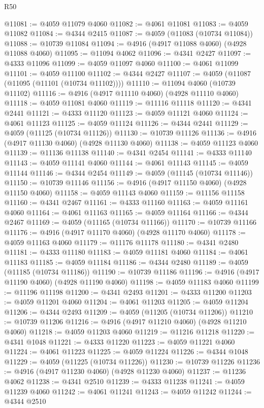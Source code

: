 \begin{lexlean}{R50}
\begin{coremodule}
@11081 := @4059 @11079 @4060
@11082 := @4061 @11081
@11083 := @4059 @11082
@11084 := @4344 @2415
@11087 := @4059 (@11083 (@10734 @11084))
@11088 := @10739 @11084
@11094 := @4916 (@4917 @11088 @4060) (@4928 @11088 @4060)
@11095 := @11094 @4062
@11096 := @4341 @2427
@11097 := @4333 @11096
@11099 := @4059 @11097 @4060
@11100 := @4061 @11099
@11101 := @4059 @11100
@11102 := @4344 @2427
@11107 := @4059 (@11087 (@11095 (@11101 (@10734 @11102))))
@11110 := @11094 @4060 (@10739 @11102)
@11116 := @4916 (@4917 @11110 @4060) (@4928 @11110 @4060)
@11118 := @4059 @11081 @4060
@11119 := @11116 @11118
@11120 := @4341 @2441
@11121 := @4333 @11120
@11123 := @4059 @11121 @4060
@11124 := @4061 @11123
@11125 := @4059 @11124
@11126 := @4344 @2441
@11129 := @4059 (@11125 (@10734 @11126))
@11130 := @10739 @11126
@11136 := @4916 (@4917 @11130 @4060) (@4928 @11130 @4060)
@11138 := @4059 @11123 @4060
@11139 := @11136 @11138
@11140 := @4341 @2454
@11141 := @4333 @11140
@11143 := @4059 @11141 @4060
@11144 := @4061 @11143
@11145 := @4059 @11144
@11146 := @4344 @2454
@11149 := @4059 (@11145 (@10734 @11146))
@11150 := @10739 @11146
@11156 := @4916 (@4917 @11150 @4060) (@4928 @11150 @4060)
@11158 := @4059 @11143 @4060
@11159 := @11156 @11158
@11160 := @4341 @2467
@11161 := @4333 @11160
@11163 := @4059 @11161 @4060
@11164 := @4061 @11163
@11165 := @4059 @11164
@11166 := @4344 @2467
@11169 := @4059 (@11165 (@10734 @11166))
@11170 := @10739 @11166
@11176 := @4916 (@4917 @11170 @4060) (@4928 @11170 @4060)
@11178 := @4059 @11163 @4060
@11179 := @11176 @11178
@11180 := @4341 @2480
@11181 := @4333 @11180
@11183 := @4059 @11181 @4060
@11184 := @4061 @11183
@11185 := @4059 @11184
@11186 := @4344 @2480
@11189 := @4059 (@11185 (@10734 @11186))
@11190 := @10739 @11186
@11196 := @4916 (@4917 @11190 @4060) (@4928 @11190 @4060)
@11198 := @4059 @11183 @4060
@11199 := @11196 @11198
@11200 := @4341 @2493
@11201 := @4333 @11200
@11203 := @4059 @11201 @4060
@11204 := @4061 @11203
@11205 := @4059 @11204
@11206 := @4344 @2493
@11209 := @4059 (@11205 (@10734 @11206))
@11210 := @10739 @11206
@11216 := @4916 (@4917 @11210 @4060) (@4928 @11210 @4060)
@11218 := @4059 @11203 @4060
@11219 := @11216 @11218
@11220 := @4341 @1048
@11221 := @4333 @11220
@11223 := @4059 @11221 @4060
@11224 := @4061 @11223
@11225 := @4059 @11224
@11226 := @4344 @1048
@11229 := @4059 (@11225 (@10734 @11226))
@11230 := @10739 @11226
@11236 := @4916 (@4917 @11230 @4060) (@4928 @11230 @4060)
@11237 := @11236 @4062
@11238 := @4341 @2510
@11239 := @4333 @11238
@11241 := @4059 @11239 @4060
@11242 := @4061 @11241
@11243 := @4059 @11242
@11244 := @4344 @2510

\end{coremodule}
\end{lexlean}
